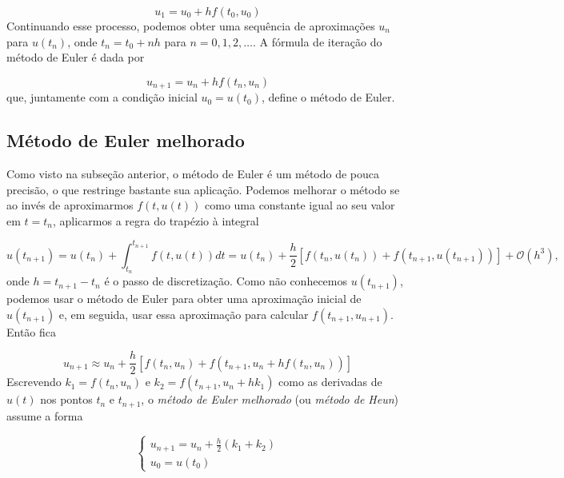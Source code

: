 \documentclass{article}
\begin{document}
\begin{equation}
    u_1 = u_0 + h f(t_0, u_0)
\end{equation}
Continuando esse processo, podemos obter uma sequência de aproximações \(u_n\) para \(u(t_n)\), onde \(t_n = t_0 + nh\) para \(n = 0, 1, 2, \ldots\). A fórmula de iteração do método de Euler é dada por

\begin{equation}
    u_{n+1} = u_n + h f(t_n, u_n)
\end{equation}
que, juntamente com a condição inicial \(u_0 = u(t_0)\), define o método de Euler.

\subsection{Método de Euler melhorado}

Como visto na subseção anterior, o método de Euler é um método de pouca precisão, o que restringe bastante sua aplicação. Podemos melhorar o método se ao invés de aproximarmos \(f(t,u(t))\) como uma constante igual ao seu valor em \(t=t_n\), aplicarmos a regra do trapézio à integral

\begin{equation}
    u(t_{n+1}) = u(t_n) + \int_{t_n}^{t_{n+1}} f(t, u(t)) dt = u(t_n) + \frac{h}{2} [f(t_n, u(t_n)) + f(t_{n+1}, u(t_{n+1}))] + \mathcal{O}(h^3),
\end{equation}
onde \(h = t_{n+1} - t_n\) é o passo de discretização. Como não conhecemos \(u(t_{n+1})\), podemos usar o método de Euler para obter uma aproximação inicial de \(u(t_{n+1})\) e, em seguida, usar essa aproximação para calcular \(f(t_{n+1}, u_{n+1})\). Então fica

\begin{equation}
    u_{n+1} \approx u_n + \frac{h}{2} [f(t_n, u_n) + f(t_{n+1}, u_n + h f(t_n, u_n))]
\end{equation}
Escrevendo \(k_1 = f(t_n, u_n)\) e \(k_2 = f(t_{n+1}, u_n + hk_1)\) como as derivadas de \(u(t)\) nos pontos \(t_n\) e \(t_{n+1}\), o \emph{método de Euler melhorado} (ou \emph{método de Heun}) assume a forma

\begin{equation}
    \begin{cases}
        u_{n+1} = u_n + \frac{h}{2} (k_1 + k_2) \\
        u_0 = u(t_0)
    \end{cases}
\end{equation}
\end{document}
